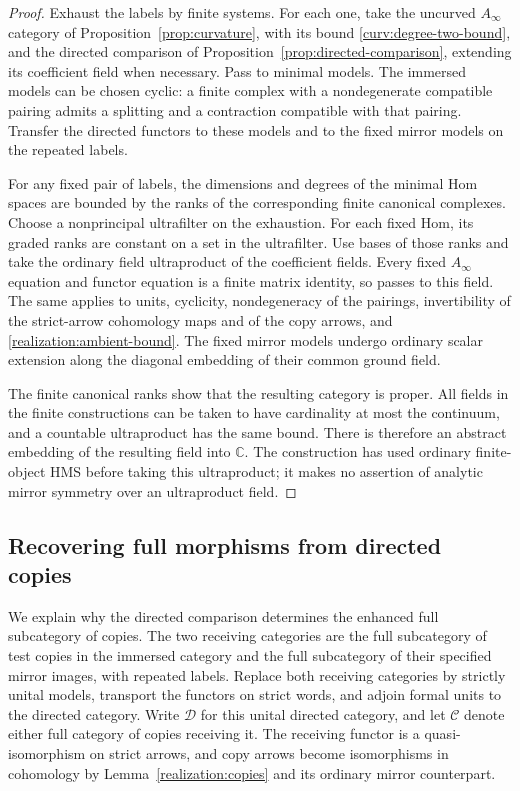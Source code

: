 \documentclass[11pt]{article}
\numberwithin{equation}{section}
\theoremstyle{definition}
\theoremstyle{remark}
\newcommand{\C}{\mathbb C}
\begin{document}
\begin{proof}
Exhaust the labels by finite systems.  For each one, take the uncurved
$A_\infty$ category of Proposition~\ref{prop:curvature}, with its bound
\eqref{curv:degree-two-bound}, and the
directed comparison of Proposition~\ref{prop:directed-comparison},
extending its coefficient field when necessary.  Pass to minimal
models.  The immersed models can be chosen cyclic: a finite complex
with a nondegenerate compatible pairing admits a splitting and a
contraction compatible with that pairing.  Transfer the directed
functors to these models and to the fixed mirror models on the repeated
labels.

For any fixed pair of labels, the dimensions and degrees of the minimal
Hom spaces are bounded by the ranks of the corresponding finite
canonical complexes.  Choose a nonprincipal ultrafilter on the
exhaustion.  For each fixed Hom, its graded ranks are constant on a set
in the ultrafilter.  Use bases of those ranks and take the ordinary
field ultraproduct of the coefficient fields.  Every fixed
$A_\infty$ equation and functor equation is a finite matrix identity,
so passes to this field.  The same applies to units, cyclicity,
nondegeneracy of the pairings, invertibility of the strict-arrow
cohomology maps and of the copy arrows, and
\eqref{realization:ambient-bound}.
The fixed mirror models undergo ordinary scalar extension along the
diagonal embedding of their common ground field.

The finite canonical ranks show that the resulting category is proper.
All fields in the finite constructions can be taken to have cardinality
at most the continuum, and a countable ultraproduct has the same bound.
There is therefore an abstract embedding of the resulting field into
$\C$.  The construction has used ordinary finite-object HMS before
taking this ultraproduct; it makes no assertion of analytic mirror
symmetry over an ultraproduct field.
\end{proof}

\subsection{Recovering full morphisms from directed copies}

We explain why the directed comparison determines the enhanced full
subcategory of copies.  The two receiving categories are the full
subcategory of test copies in the immersed category and the full
subcategory of their specified mirror images, with repeated labels.
Replace both receiving categories by
strictly unital models, transport the functors on strict words, and
adjoin formal units to the directed category.  Write $\mathcal D$ for
this unital directed category, and let $\mathcal C$ denote either full
category of copies receiving it.  The receiving functor is a
quasi-isomorphism on strict arrows, and copy arrows become isomorphisms
in cohomology by Lemma~\ref{realization:copies} and its ordinary mirror
counterpart.
\end{document}
